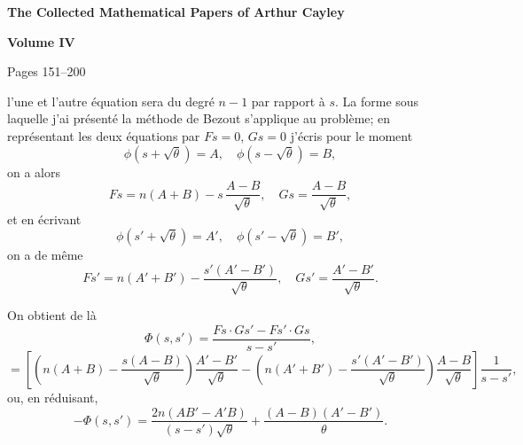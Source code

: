 \documentclass[11pt,a4paper]{book}
\begin{document}
\begin{center}
  \LARGE\textbf{The Collected Mathematical Papers of Arthur Cayley}

  \Large\textbf{Volume IV}

  \vspace{2em}
  \large Pages 151--200
\end{center}

\vspace{3em}


\newpage



l'une et l'autre \'{e}quation sera du degr\'{e} $n-1$ par rapport \`{a} $s$. La forme sous laquelle j'ai pr\'{e}sent\'{e} la m\'{e}thode de Bezout s'applique au probl\`{e}me; en repr\'{e}sentant les deux \'{e}quations par $Fs=0$, $Gs=0$ j'\'{e}cris pour le moment
\[
\phi(s + \surd\theta) = A, \quad \phi(s - \surd\theta) = B,
\]
on a alors
\[
Fs = n(A+B) - s\,\frac{A-B}{\surd\theta}, \quad Gs = \frac{A-B}{\surd\theta},
\]
et en \'{e}crivant
\[
\phi(s' + \surd\theta) = A', \quad \phi(s' - \surd\theta) = B',
\]
on a de m\^{e}me
\[
Fs' = n(A'+B') - \frac{s'(A'-B')}{\surd\theta}, \quad Gs' = \frac{A'-B'}{\surd\theta}.
\]

On obtient de l\`{a}
\[
\Phi(s,s') = \frac{Fs \cdot Gs' - Fs' \cdot Gs}{s - s'},
\]
\[
= \left[\left(n(A+B) - \frac{s(A-B)}{\surd\theta}\right)\frac{A'-B'}{\surd\theta} - \left(n(A'+B') - \frac{s'(A'-B')}{\surd\theta}\right)\frac{A-B}{\surd\theta}\right]\frac{1}{s-s'},
\]
ou, en r\'{e}duisant,
\[
-\Phi(s,s') = \frac{2n(AB' - A'B)}{(s-s')\surd\theta} + \frac{(A-B)(A'-B')}{\theta}.
\]
\end{document}
